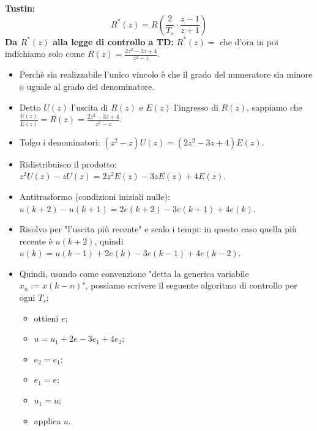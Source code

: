 \textbf{Tustin:}
\[
    R^*(z) = R( \frac{2}{T_s} \cdot \frac{z-1}{z+1})
\]
\textbf{Da $R^*(z)$ alla legge di controllo a TD:}\newline
$R^*(z) = $ che d'ora in poi indichiamo solo come $R(z) = \frac{2z^2 - 3z +4}{z^2 -z}$. 
\begin{itemize}
    \item Perchè sia realizzabile l'unico vincolo è che il grado del numeratore sia minore o uguale al grado del denominatore.
    \item  Detto $U(z)$ l'uscita di $R(z)$ e $E(z)$ l'ingresso di $R(z)$, sappiamo che $\frac{U(z)}{E(z)} = R(z) = \frac{2z^2 - 3z +4}{z^2 -z}$.
    \item Tolgo i denominatori: $(z^2-z) U(z) = (2z^2 -3z+4) E(z)$.
    \item Ridistribuisco il prodotto: $z^2 U(z) - z U(z) = 2z^2 E(z) - 3zE(z) + 4 E(z)$.
    \item Antitrasformo (condizioni iniziali nulle): $u(k+2) - u(k+1) = 2e(k+2) -3e(k+1) + 4e(k)$.
    \item Risolvo per "l'uscita più recente" e scalo i tempi: in questo caso quella più recente è $u(k+2)$, quindi $u(k) = u(k-1) + 2 e(k) -3e(k-1) + 4e(k-2)$.
    \item Quindi, usando come convenzione "detta la generica variabile $x_n := x(k-n)$", possiamo scrivere il seguente algoritmo di controllo per ogni $T_s$:
    \begin{itemize}
        \item ottieni $e$;
        \item $u = u_1 +  2e - 3e_1 + 4e_2$;
        \item $e_2 = e_1$;
        \item $e_1 = e$;
        \item $u_1 = u$;
        \item applica $u$.
    \end{itemize}
\end{itemize}
